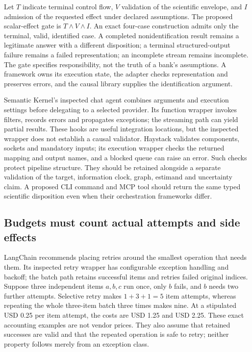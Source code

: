 Let \(T\) indicate terminal control flow, \(V\) validation of the scientific envelope, and \(I\)
admission of the requested effect under declared assumptions. The proposed scalar-effect gate is
\(T\land V\land I\). An exact four-case construction admits only the terminal, valid, identified
case. A completed nonidentification result remains a legitimate answer with a different disposition;
a terminal structured-output failure remains a failed representation; an incomplete stream remains
incomplete. The gate specifies responsibility, not the truth of a bank's assumptions. A framework
owns its execution state, the adapter checks representation and preserves errors, and the causal
library supplies the identification argument.\citep{exec28_dl_reference}

Semantic Kernel's inspected chat agent combines arguments and execution settings before delegating
to a selected provider. Its function wrapper invokes filters, records errors and propagates
exceptions; the streaming path can yield partial results. These hooks are useful integration
locations, but the inspected wrapper does not establish a causal validator. Haystack validates
components, sockets and mandatory inputs; its execution wrapper checks the returned mapping and
output names, and a blocked queue can raise an error. Such checks protect pipeline structure.
They should be retained alongside a separate validation of the target, information clock, graph,
estimand and uncertainty claim. A proposed CLI command and MCP tool should return the same typed
scientific disposition even when their orchestration frameworks differ.
\citep{exec28_dl_semantic_kernel,exec28_dl_haystack}

\subsection{Budgets must count actual attempts and side effects}
LangChain recommends placing retries around the smallest operation that needs them. Its inspected
retry wrapper has configurable exception handling and backoff; the batch path retains successful
items and retries failed original indices. Suppose three independent items \(a,b,c\) run once,
only \(b\) fails, and \(b\) needs two further attempts. Selective retry makes \(1+3+1=5\) item
attempts, whereas repeating the whole three-item batch three times makes nine. At a stipulated
USD 0.25 per item attempt, the costs are USD 1.25 and USD 2.25. These exact accounting examples
are not vendor prices. They also assume that retained successes are valid and that the repeated
operation is safe to retry; neither property follows merely from an exception class.
\citep{exec28_dl_langchain,exec28_dl_reference}

